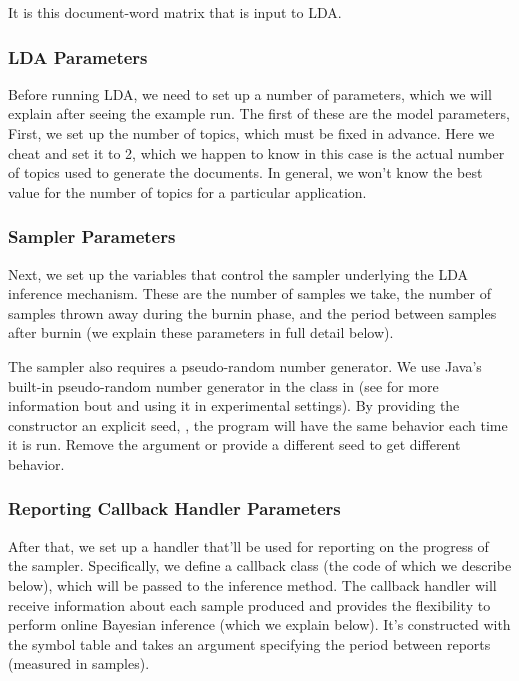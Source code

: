 It is this document-word matrix that is input to LDA.  

\subsubsection{LDA Parameters}

Before running LDA, we need to set up a number of parameters, which we
will explain after seeing the example run.  The first of these are the
model parameters,
%
%
First, we set up the number of topics, which must be fixed in advance.
Here we cheat and set it to 2, which we happen to know in this case is
the actual number of topics used to generate the documents.  In
general, we won't know the best value for the number of topics for a
particular application.

\subsubsection{Sampler Parameters}

Next, we set up the variables that control the sampler underlying
the LDA inference mechanism.
%
%
These are the number of samples we take, the number of samples thrown
away during the burnin phase, and the period between samples after
burnin (we explain these parameters in full detail below).  

The sampler also requires a pseudo-random number generator.  We use
Java's built-in pseudo-random number generator in the class
 in  (see  for
more information bout  and using it in experimental
settings).  By providing the constructor an explicit seed, ,
the program will have the same behavior each time it is run.  Remove
the argument or provide a different seed to get different behavior.

\subsubsection{Reporting Callback Handler Parameters}

After that, we set up a handler that'll be used for reporting on the
progress of the sampler.  Specifically, we define a callback class
 (the code of which we describe
below), which will be passed to the inference method.
%
%
The callback handler will receive information about each sample
produced and provides the flexibility to perform online Bayesian
inference (which we explain below).  It's constructed with the
symbol table and takes an argument specifying the period between
reports (measured in samples).

